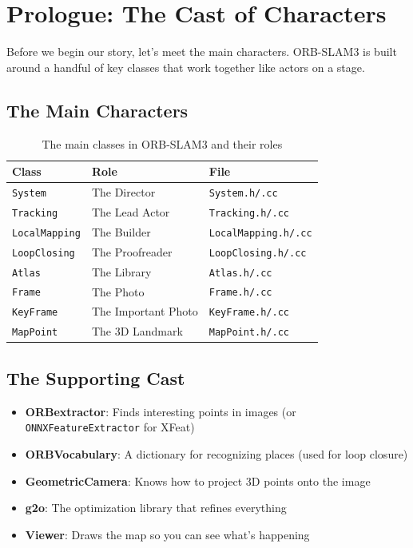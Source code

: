 \section{Prologue: The Cast of Characters}

Before we begin our story, let's meet the main characters. ORB-SLAM3 is built around a handful of key classes that work together like actors on a stage.

\subsection{The Main Characters}

\begin{table}[H]
\centering
\begin{tabular}{@{}lll@{}}
\toprule
\textbf{Class} & \textbf{Role} & \textbf{File} \\ 
\midrule
\texttt{System} & The Director & \texttt{System.h/.cc} \\
\texttt{Tracking} & The Lead Actor & \texttt{Tracking.h/.cc} \\
\texttt{LocalMapping} & The Builder & \texttt{LocalMapping.h/.cc} \\
\texttt{LoopClosing} & The Proofreader & \texttt{LoopClosing.h/.cc} \\
\texttt{Atlas} & The Library & \texttt{Atlas.h/.cc} \\
\texttt{Frame} & The Photo & \texttt{Frame.h/.cc} \\
\texttt{KeyFrame} & The Important Photo & \texttt{KeyFrame.h/.cc} \\
\texttt{MapPoint} & The 3D Landmark & \texttt{MapPoint.h/.cc} \\
\bottomrule
\end{tabular}
\caption{The main classes in ORB-SLAM3 and their roles}
\end{table}

\subsection{The Supporting Cast}

\begin{itemize}[leftmargin=*]
    \item \textbf{ORBextractor}: Finds interesting points in images (or \texttt{ONNXFeatureExtractor} for XFeat)
    \item \textbf{ORBVocabulary}: A dictionary for recognizing places (used for loop closure)
    \item \textbf{GeometricCamera}: Knows how to project 3D points onto the image
    \item \textbf{g2o}: The optimization library that refines everything
    \item \textbf{Viewer}: Draws the map so you can see what's happening
\end{itemize}

